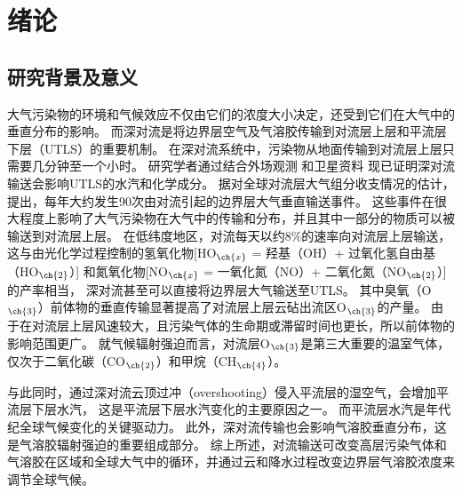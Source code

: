 
\chapter{绪论}

\section{研究背景及意义}

大气污染物的环境和气候效应不仅由它们的浓度大小决定，还受到它们在大气中的垂直分布的影响。
而深对流是将边界层空气及气溶胶传输到对流层上层和平流层下层（UTLS）的重要机制\citep{Chatfield.1984,Dickerson.1987,Pickering.1989,Yin.2002}。
在深对流系统中，污染物从地面传输到对流层上层只需要几分钟至一个小时\citep{Skamarock.2000}。
研究学者通过结合外场观测\citep{Dickerson.1987,Pickering.1996,Bertram.2007,Apel.2012,Pan.2017}
和卫星资料\citep{Halland.2009,Barth.2012,Livesey.2013,Jensen.2015}
现已证明深对流输送会影响UTLS的水汽和化学成分。
据对全球对流层大气组分收支情况的估计，\citet{Cotton.1995}提出，每年大约发生90次由对流引起的边界层大气垂直输送事件。
这些事件在很大程度上影响了大气污染物在大气中的传输和分布，并且其中一部分的物质可以被输送到对流层上层。
在低纬度地区，对流每天以约8\%的速率向对流层上层输送，
这与由光化学过程控制的氢氧化物[HO$_{\ch{x}}$ = 羟基（OH）+ 过氧化氢自由基（HO$_{\ch{2}}$）]
和氮氧化物[NO$_{\ch{x}}$ = 一氧化氮（NO）+ 二氧化氮（NO$_{\ch{2}}$）]的产率相当，
深对流甚至可以直接将边界层大气输送至UTLS\citep{Prather.1997}。
其中臭氧（O$_{\ch{3}}$）前体物的垂直传输显著提高了对流层上层云砧出流区O$_{\ch{3}}$的产量\citep{Pickering.1990,Pickering.1992,Pickering.1992a}。
由于在对流层上层风速较大，且污染气体的生命期或滞留时间也更长，所以前体物的影响范围更广。
就气候辐射强迫而言，对流层O$_{\ch{3}}$是第三大重要的温室气体\citep{Myhre.2013}，仅次于二氧化碳（CO$_{\ch{2}}$）和甲烷（CH$_{\ch{4}}$）。

与此同时，通过深对流云顶过冲（overshooting）侵入平流层的湿空气，会增加平流层下层水汽\citep{Homeyer.2014}，
这是平流层下层水汽变化的主要原因之一。
而平流层水汽是年代纪全球气候变化的关键驱动力\citep{Solomon.2010}。 此外，深对流传输也会影响气溶胶垂直分布，这是气溶胶辐射强迫的重要组成部分\citep{Mishra.2012,Park.2015}。
综上所述，对流输送可改变高层污染气体和气溶胶在区域和全球大气中的循环\citep{Clarisse.2011}，并通过云和降水过程改变边界层气溶胶浓度来调节全球气候\citep{Taylor.1997}。

